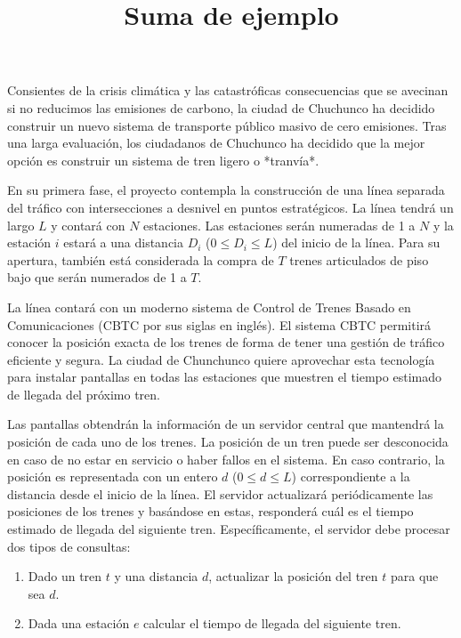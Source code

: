 \documentclass{oci}
\title{Suma de ejemplo}
\begin{document}
\begin{problemDescription}
  Consientes de la crisis climática y las catastróficas consecuencias que se avecinan si no reducimos
  las emisiones de carbono, la ciudad de Chuchunco ha decidido construir un nuevo sistema de transporte
  público masivo de cero emisiones.
  Tras una larga evaluación, los ciudadanos de Chuchunco ha decidido que la mejor opción es construir un
  sistema de tren ligero o *tranvía*.

  En su primera fase, el proyecto contempla la construcción de una línea separada del tráfico con
  intersecciones a desnivel en puntos estratégicos.
  La línea tendrá un largo $L$ y contará con $N$ estaciones.
  Las estaciones serán numeradas de 1 a $N$ y la estación $i$ estará a una distancia $D_i$
  ($0 \leq D_i \leq L$) del inicio de la línea.
  Para su apertura, también está considerada la compra de $T$ trenes articulados de piso bajo
  que serán numerados de 1 a $T$.

  La línea contará con un moderno sistema de Control de Trenes Basado en Comunicaciones (CBTC por
  sus siglas en inglés).
  El sistema CBTC permitirá conocer la posición exacta de los trenes de forma de tener una gestión
  de tráfico eficiente y segura.
  La ciudad de Chunchunco quiere aprovechar esta tecnología para instalar pantallas en todas las
  estaciones que muestren el tiempo estimado de llegada del próximo tren.

  Las pantallas obtendrán la información de un servidor central que mantendrá la posición de cada
  uno de los trenes.
  La posición de un tren puede ser desconocida en caso de no estar en servicio o haber fallos en el
  sistema.
  En caso contrario, la posición es representada con un entero $d$ ($0 \leq d\leq L$) correspondiente
  a la distancia desde el inicio de la línea.
  El servidor actualizará periódicamente las posiciones de los trenes y basándose en estas, responderá
  cuál es el tiempo estimado de llegada del siguiente tren.
  Específicamente, el servidor debe procesar dos tipos de consultas:
  \begin{enumerate}
    \item Dado un tren $t$ y una distancia $d$, actualizar la posición del tren $t$ para que sea $d$.
    \item Dada una estación $e$ calcular el tiempo de llegada del siguiente tren.
  \end{enumerate}
\end{problemDescription}
\end{document}
